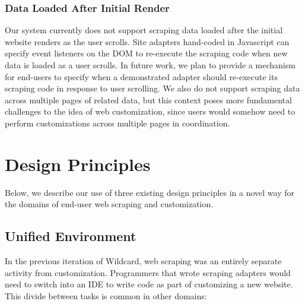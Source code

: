 \documentclass[sigconf,10pt]{acmart}
\begin{document}
\hypertarget{data-loaded-after-initial-render}{%
\subsubsection{Data Loaded After Initial
Render}\label{data-loaded-after-initial-render}}

Our system currently does not support scraping data loaded after the
initial website renders as the user scrolls. Site adapters hand-coded in
Javascript can specify event listeners on the DOM to re-execute the
scraping code when new data is loaded as a user scrolls. In future work,
we plan to provide a mechanism for end-users to specify when a
demonstrated adapter should re-execute its scraping code in response to
user scrolling. We also do not support scraping data across multiple
pages of related data, but this context poses more fundamental
challenges to the idea of web customization, since users would somehow
need to perform customizations across multiple pages in coordination.

\hypertarget{sec:design-principles}{%
\section{Design Principles}\label{sec:design-principles}}

Below, we describe our use of three existing design principles in a
novel way for the domains of end-user web scraping and customization.

\hypertarget{unified-environment}{%
\subsection{Unified Environment}\label{unified-environment}}

In the previous iteration of Wildcard, web scraping was an entirely
separate activity from customization. Programmers that wrote scraping
adapters would need to switch into an IDE to write code as part of
customizing a new website. This divide between tasks is common in other
domains:
\end{document}

